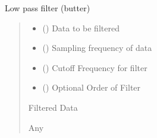\documentclass[letterpaper,10pt,english]{sphinxmanual}
\begin{document}
\begin{fulllineitems}
\label{\detokenize{BehaviorUtilities:BehaviorUtilities.lowpass_filter}}
\pysigstartsignatures
{}
\pysigstopsignatures
\sphinxAtStartPar
Low pass filter (butter)
\begin{quote}\begin{description}
\begin{itemize}
\item {} 
\sphinxAtStartPar
{} () \textendash{} Data to be filtered

\item {} 
\sphinxAtStartPar
{} () \textendash{} Sampling frequency of data

\item {} 
\sphinxAtStartPar
{} () \textendash{} Cutoff Frequency for filter

\item {} 
\sphinxAtStartPar
{} (\sphinxstyleliteralemphasis{\sphinxupquote{{[}}}\sphinxstyleliteralemphasis{\sphinxupquote{{]}}}) \textendash{} Optional Order of Filter

\end{itemize}

\sphinxAtStartPar
Filtered Data

\sphinxAtStartPar
Any

\end{description}\end{quote}

\end{fulllineitems}
\end{document}
